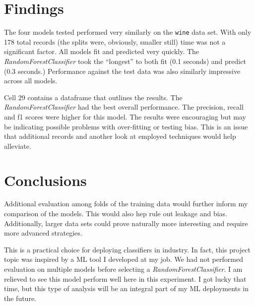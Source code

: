 \documentclass[11pt,letterpaper]{article}
\begin{document}
\section{Findings} \label{sec:findings}
\tab The four models tested performed very similarly on the \texttt{wine} data set. With only 178 total records (the splits were, obviously, smaller still) time was not a significant factor. All models fit and predicted very quickly. The \emph{RandomForestClassifier} took the ``longest'' to both fit (0.1 seconds) and predict (0.3 seconds.) Performance against the test data was also similarly impressive across all models.

Cell 29 contains a dataframe that outlines the results. The \emph{RandomForestClassifier} had the best overall performance. The precision, recall and f1 scores were higher for this model. The results were encouraging but may be indicating possible problems with over-fitting or testing bias. This is an issue that additional records and another look at employed techniques would help alleviate. 

\section{Conclusions}
\tab Additional evaluation among folds of the training data would further inform my comparison of the models. This would also hep rule out leakage and bias. Additionally, larger data sets could prove naturally more interesting and require more advanced strategies. 

This is a practical choice for deploying classifiers in industry. In fact, this project topic was inspired by a ML tool I developed at my job. We had not performed evaluation on multiple models before selecting a \emph{RandomForestClassifier}. I am relieved to see this model perform well here in this experiment. I got lucky that time, but this type of analysis will be an integral part of my ML deployments in the future.

\pagebreak
\section*{}
\end{document}
